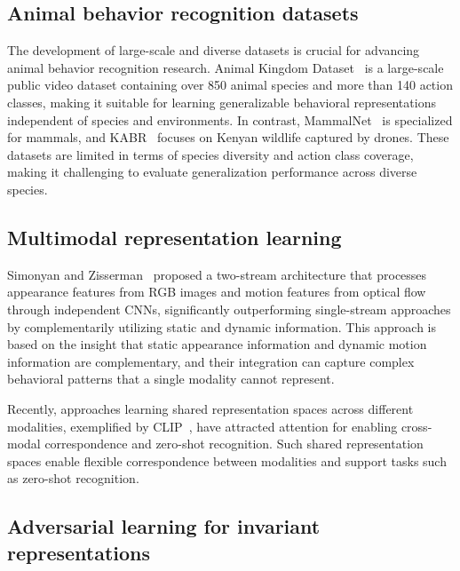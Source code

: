 \documentclass[twocolumn]{svjour3}
\begin{document}
\subsection{Animal behavior recognition datasets}

The development of large-scale and diverse datasets is crucial for advancing animal behavior recognition research.
Animal Kingdom Dataset~\cite{ng2022animal} is a large-scale public video dataset containing over 850 animal species and more than 140 action classes, making it suitable for learning generalizable behavioral representations independent of species and environments.
In contrast, MammalNet~\cite{mammalnet} is specialized for mammals, and KABR~\cite{kabr} focuses on Kenyan wildlife captured by drones.
These datasets are limited in terms of species diversity and action class coverage, making it challenging to evaluate generalization performance across diverse species.

\subsection{Multimodal representation learning}

Simonyan and Zisserman~\cite{simonyan2014two} proposed a two-stream architecture that processes appearance features from RGB images and motion features from optical flow through independent CNNs, significantly outperforming single-stream approaches by complementarily utilizing static and dynamic information.
This approach is based on the insight that static appearance information and dynamic motion information are complementary, and their integration can capture complex behavioral patterns that a single modality cannot represent.

Recently, approaches learning shared representation spaces across different modalities, exemplified by CLIP~\cite{radford2021clip}, have attracted attention for enabling cross-modal correspondence and zero-shot recognition.
Such shared representation spaces enable flexible correspondence between modalities and support tasks such as zero-shot recognition.

\subsection{Adversarial learning for invariant representations}
\end{document}
